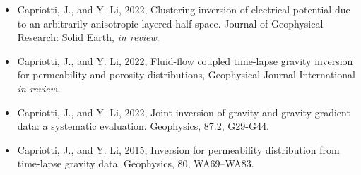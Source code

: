 


\cvparagraph
\begin{itemize}
\item Capriotti, J., and Y. Li, 2022, Clustering inversion of electrical potential due to an arbitrarily anisotropic layered half-space. Journal of Geophysical Research: Solid Earth, \textit{in review}.
\item Capriotti, J., and Y. Li, 2022, Fluid-flow coupled time-lapse gravity inversion for permeability and porosity distributions, Geophysical Journal International \textit{in review}.
\item Capriotti, J., and Y. Li, 2022, Joint inversion of gravity and gravity gradient data: a systematic evaluation. Geophysics, 87:2, G29-G44.
\item Capriotti, J., and Y. Li, 2015, Inversion for permeability distribution from time-lapse gravity data. Geophysics, 80, WA69–WA83.
\end{itemize}

